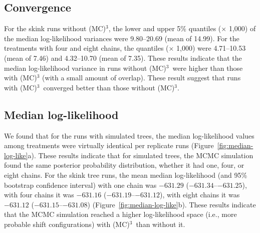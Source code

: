 \documentclass[12pt]{article}
\newcommand{\MCMCMC}{(MC)$^{3}$}
\begin{document}
\subsection*{Convergence}

For the skink runs without \MCMCMC,
the lower and upper 5\% quantiles ($\times$ 1,000)
of the median log-likelihood variances were 9.80--20.69 (mean of 14.99).
%
For the treatments with four and eight chains,
the quantiles ($\times$ 1,000) were 4.71--10.53 (mean of 7.46)
and 4.32--10.70 (mean of 7.35).
%
These results indicate that the median log-likelihood variance
in runs without \MCMCMC\ were higher than those with \MCMCMC
(with a small amount of overlap).
%
These result suggest that runs with \MCMCMC\ 
converged better than those without \MCMCMC.


\subsection*{Median log-likelihood}

We found that for the runs with simulated trees,
the median log-likelihood values among treatments
were virtually identical per replicate runs (Figure~\ref{fig:median-log-like}a).
%
These results indicate that for simulated trees,
the MCMC simulation found the same posterior probability distribution,
whether it had one, four, or eight chains.
%
For the skink tree runs,
the mean median log-likelihood (and 95\% bootstrap confidence interval)
with one chain was $-631.29$ ($-631.34$--$-631.25$),
with four chains it was $-631.16$ ($-631.19$--$-631.12$),
with eight chains it was $-631.12$ ($-631.15$--$-631.08$)
(Figure~\ref{fig:median-log-like}b).
%
These results indicate that the MCMC simulation
reached a higher log-likelihood space
(i.e., more probable shift configurations)
with \MCMCMC\ than without it.
\end{document}
